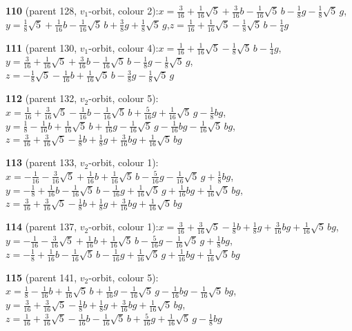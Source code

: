 \documentclass[10pt]{article}
\begin{document}
{\noindent\textbf{110} (parent 128, $v_1$-orbit, colour 2):\quad $x=\tfrac{3}{16}+\tfrac{1}{16}\sqrt5+\tfrac{3}{16}b-\tfrac{1}{16}\sqrt5\,b-\tfrac{1}{8}g-\tfrac{1}{8}\sqrt5\,g$,\quad $y=\tfrac{1}{8}\sqrt5+\tfrac{1}{16}b-\tfrac{1}{16}\sqrt5\,b+\tfrac{3}{8}g+\tfrac{1}{8}\sqrt5\,g$,\quad $z=\tfrac{1}{16}+\tfrac{1}{16}\sqrt5-\tfrac{1}{8}\sqrt5\,b-\tfrac{1}{4}g$\par\smallskip
\noindent\textbf{111} (parent 130, $v_1$-orbit, colour 4):\quad $x=\tfrac{1}{16}+\tfrac{1}{16}\sqrt5-\tfrac{1}{8}\sqrt5\,b-\tfrac{1}{4}g$,\quad $y=\tfrac{3}{16}+\tfrac{1}{16}\sqrt5+\tfrac{3}{16}b-\tfrac{1}{16}\sqrt5\,b-\tfrac{1}{8}g-\tfrac{1}{8}\sqrt5\,g$,\quad $z=-\tfrac{1}{8}\sqrt5-\tfrac{1}{16}b+\tfrac{1}{16}\sqrt5\,b-\tfrac{3}{8}g-\tfrac{1}{8}\sqrt5\,g$\par\smallskip
\noindent\textbf{112} (parent 132, $v_2$-orbit, colour 5):\quad $x=\tfrac{1}{16}+\tfrac{3}{16}\sqrt5-\tfrac{1}{16}b-\tfrac{1}{16}\sqrt5\,b+\tfrac{5}{16}g+\tfrac{1}{16}\sqrt5\,g-\tfrac{1}{8}bg$,\quad $y=\tfrac{1}{8}-\tfrac{1}{16}b+\tfrac{1}{16}\sqrt5\,b+\tfrac{1}{16}g-\tfrac{1}{16}\sqrt5\,g-\tfrac{1}{16}bg-\tfrac{1}{16}\sqrt5\,bg$,\quad $z=\tfrac{3}{16}+\tfrac{3}{16}\sqrt5-\tfrac{1}{8}b+\tfrac{1}{8}g+\tfrac{3}{16}bg+\tfrac{1}{16}\sqrt5\,bg$\par\smallskip
\noindent\textbf{113} (parent 133, $v_2$-orbit, colour 1):\quad $x=-\tfrac{1}{16}-\tfrac{3}{16}\sqrt5+\tfrac{1}{16}b+\tfrac{1}{16}\sqrt5\,b-\tfrac{5}{16}g-\tfrac{1}{16}\sqrt5\,g+\tfrac{1}{8}bg$,\quad $y=-\tfrac{1}{8}+\tfrac{1}{16}b-\tfrac{1}{16}\sqrt5\,b-\tfrac{1}{16}g+\tfrac{1}{16}\sqrt5\,g+\tfrac{1}{16}bg+\tfrac{1}{16}\sqrt5\,bg$,\quad $z=\tfrac{3}{16}+\tfrac{3}{16}\sqrt5-\tfrac{1}{8}b+\tfrac{1}{8}g+\tfrac{3}{16}bg+\tfrac{1}{16}\sqrt5\,bg$\par\smallskip
\noindent\textbf{114} (parent 137, $v_2$-orbit, colour 1):\quad $x=\tfrac{3}{16}+\tfrac{3}{16}\sqrt5-\tfrac{1}{8}b+\tfrac{1}{8}g+\tfrac{3}{16}bg+\tfrac{1}{16}\sqrt5\,bg$,\quad $y=-\tfrac{1}{16}-\tfrac{3}{16}\sqrt5+\tfrac{1}{16}b+\tfrac{1}{16}\sqrt5\,b-\tfrac{5}{16}g-\tfrac{1}{16}\sqrt5\,g+\tfrac{1}{8}bg$,\quad $z=-\tfrac{1}{8}+\tfrac{1}{16}b-\tfrac{1}{16}\sqrt5\,b-\tfrac{1}{16}g+\tfrac{1}{16}\sqrt5\,g+\tfrac{1}{16}bg+\tfrac{1}{16}\sqrt5\,bg$\par\smallskip
\noindent\textbf{115} (parent 141, $v_2$-orbit, colour 5):\quad $x=\tfrac{1}{8}-\tfrac{1}{16}b+\tfrac{1}{16}\sqrt5\,b+\tfrac{1}{16}g-\tfrac{1}{16}\sqrt5\,g-\tfrac{1}{16}bg-\tfrac{1}{16}\sqrt5\,bg$,\quad $y=\tfrac{3}{16}+\tfrac{3}{16}\sqrt5-\tfrac{1}{8}b+\tfrac{1}{8}g+\tfrac{3}{16}bg+\tfrac{1}{16}\sqrt5\,bg$,\quad $z=\tfrac{1}{16}+\tfrac{3}{16}\sqrt5-\tfrac{1}{16}b-\tfrac{1}{16}\sqrt5\,b+\tfrac{5}{16}g+\tfrac{1}{16}\sqrt5\,g-\tfrac{1}{8}bg$\par\smallskip
}
\end{document}
